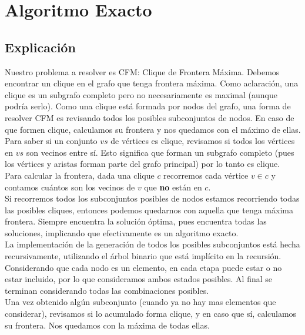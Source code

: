 
\section{Algoritmo Exacto}

\subsection{Explicación}

Nuestro problema a resolver es CFM: Clique de Frontera Máxima. Debemos encontrar un clique en el grafo que tenga frontera máxima. Como aclaración, una clique es un subgrafo completo pero no necesariamente es maximal (aunque podría serlo). Como una clique está formada por nodos del grafo, una forma de resolver CFM es revisando todos los posibles subconjuntos de nodos. En caso de que formen clique, calculamos su frontera y nos quedamos con el máximo de ellas.  \\

Para saber si un conjunto $vs$ de vértices es clique, revisamos si todos los vértices en $vs$ son vecinos entre sí. Esto significa que forman un subgrafo completo (pues los vértices y aristas forman parte del grafo principal) por lo tanto es clique. \\

Para calcular la frontera, dada una clique $c$ recorremos cada vértice $v \in c$ y contamos cuántos son los vecinos de $v$ que \textbf{no} están en $c$. \\

Si recorremos todos los subconjuntos posibles de nodos estamos recorriendo todas las posibles cliques, entonces podemos quedarnos con aquella que tenga máxima frontera. Siempre encuentra la solución óptima, pues encuentra todas las soluciones, implicando que efectivamente es un algoritmo exacto. \\

La implementación de la generación de todos los posibles subconjuntos está hecha recursivamente, utilizando el árbol binario que está implícito en la recursión. Considerando que cada nodo es un elemento, en cada etapa puede estar o no estar incluido, por lo que consideramos ambos estados posibles. Al final se terminan considerando todas las combinaciones posibles. \\

Una vez obtenido algún subconjunto (cuando ya no hay mas elementos que considerar), revisamos si lo acumulado forma clique, y en caso que sí, calculamos su frontera. Nos quedamos con la máxima de todas ellas. \\

